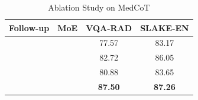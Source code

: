 \documentclass[11pt]{article}
\newcommand{\greencheck}{\textcolor{darkgreen}{\ding{51}}}
\begin{document}

\begin{table}
\centering
\small
\setlength{\extrarowheight}{0pt}
\addtolength{\extrarowheight}{\aboverulesep}
\addtolength{\extrarowheight}{\belowrulesep}
\setlength{\aboverulesep}{0pt}
\setlength{\belowrulesep}{0pt}
\caption{Ablation Study on MedCoT}
\label{xiaorong}
\begin{tabular}{cc|cc} 
\toprule
Follow-up & MoE & VQA-RAD                                        & SLAKE-EN                                        \\ 
\hline
          &     & 77.57                                          & 83.17                                           \\
   \greencheck       &     & 82.72                                          & 86.05                                           \\
          &  \greencheck   & 80.88                                          & 83.65                                           \\
  \greencheck        &  \greencheck   & {\cellcolor[rgb]{1,0.875,0.757}}\textbf{87.50} & {\cellcolor[rgb]{1,0.875,0.757}}\textbf{87.26}  \\
\bottomrule
\end{tabular}
\end{table}
\end{document}
